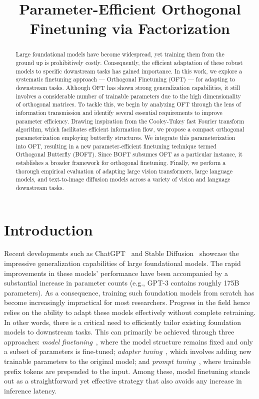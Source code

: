 \title{Parameter-Efficient Orthogonal Finetuning via Factorization}

\begin{abstract}
Large foundational models have become widespread, yet training them from the ground up is prohibitively costly. Consequently, the efficient adaptation of these robust models to specific downstream tasks has gained importance. In this work, we explore a systematic finetuning approach — Orthogonal Finetuning (OFT) — for adapting to downstream tasks. Although OFT has shown strong generalization capabilities, it still involves a considerable number of trainable parameters due to the high dimensionality of orthogonal matrices. To tackle this, we begin by analyzing OFT through the lens of information transmission and identify several essential requirements to improve parameter efficiency. Drawing inspiration from the Cooley-Tukey fast Fourier transform algorithm, which facilitates efficient information flow, we propose a compact orthogonal parameterization employing butterfly structures. We integrate this parameterization into OFT, resulting in a new parameter-efficient finetuning technique termed Orthogonal Butterfly (BOFT). Since BOFT subsumes OFT as a particular instance, it establishes a broader framework for orthogonal finetuning. Finally, we perform a thorough empirical evaluation of adapting large vision transformers, large language models, and text-to-image diffusion models across a variety of vision and language downstream tasks.
\end{abstract}

\section{Introduction}

Recent developments such as ChatGPT~\cite{brown2020language,chen2021evaluating} and Stable Diffusion~\cite{rombach2022high} showcase the impressive generalization capabilities of large foundational models. The rapid improvements in these models’ performance have been accompanied by a substantial increase in parameter counts (e.g., GPT-3 contains roughly 175B parameters). As a consequence, training such foundation models from scratch has become increasingly impractical for most researchers. Progress in the field hence relies on the ability to adapt these models effectively without complete retraining. In other words, there is a critical need to efficiently tailor existing foundation models to downstream tasks. This can primarily be achieved through three approaches: \emph{model finetuning}~\cite{hulora2022,zaken2022bitfit,guo2020parameter,raffel2020exploring,qiu2023controlling,zhang2022adaptive,chavan2023one}, where the model structure remains fixed and only a subset of parameters is fine-tuned; \emph{adapter tuning}~\cite{rebuffi2017learning,houlsby2019parameter,pfeiffer2020adapterfusion,lin2020exploring,he2021towards}, which involves adding new trainable parameters to the original model; and \emph{prompt tuning}~\cite{li2021prefix,lester2021power}, where trainable prefix tokens are prepended to the input. Among these, model finetuning stands out as a straightforward yet effective strategy that also avoids any increase in inference latency.

